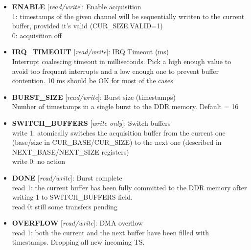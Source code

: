 \begin{itemize}
\item \begin{small}
{\bf 
ENABLE
} [\emph{read/write}]: Enable acquisition
\\
1: timestamps of the given channel will be sequentially written to the current buffer, provided it's valid (CUR\_SIZE.VALID=1) \\0: acquisition off
\end{small}
\item \begin{small}
{\bf 
IRQ\_TIMEOUT
} [\emph{read/write}]: IRQ Timeout (ms)
\\
Interrupt coalescing timeout in milliseconds. Pick a high enough value to avoid too frequent interrupts and a low enough one to prevent buffer contention. 10 ms should be OK for most of the cases
\end{small}
\item \begin{small}
{\bf 
BURST\_SIZE
} [\emph{read/write}]: Burst size (timestamps)
\\
Number of timestamps in a single burst to the DDR memory. Default = 16
\end{small}
\item \begin{small}
{\bf 
SWITCH\_BUFFERS
} [\emph{write-only}]: Switch buffers
\\
write 1: atomically switches the acquisition buffer from the current one (base/size in CUR\_BASE/CUR\_SIZE) to the next one (described in NEXT\_BASE/NEXT\_SIZE registers)\\write 0: no action
\end{small}
\item \begin{small}
{\bf 
DONE
} [\emph{read/write}]: Burst complete
\\
read 1: the current buffer has been fully committed to the DDR memory after writing 1 to SWITCH\_BUFFERS field.\\read 0: still some transfers pending
\end{small}
\item \begin{small}
{\bf 
OVERFLOW
} [\emph{read/write}]: DMA overflow
\\
read 1: both the current and the next buffer have been filled with timestamps. Dropping all new incoming TS.
\end{small}
\end{itemize}
